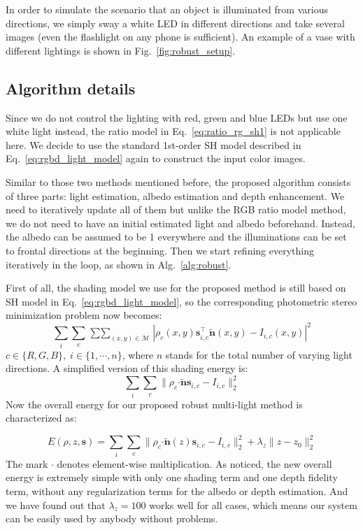 In order to simulate the scenario that an object is illuminated from various directions, we simply sway a white LED in different directions and take several images (even the flashlight on any phone is sufficient). An example of a vase with different lightings is shown in Fig.~\ref{fig:robust_setup}.

\subsection{Algorithm details}
Since we do not control the lighting with red, green and blue LEDs but use one white light instead, the ratio model in Eq.~\ref{eq:ratio_rg_sh1} is not applicable here.
We decide to use the standard 1st-order SH model described in Eq.~\ref{eq:rgbd_light_model} again to construct the input color images.

Similar to those two methods mentioned before, the proposed algorithm consists of three parts: light estimation, albedo estimation and depth enhancement. 
We need to iteratively update all of them but unlike the RGB ratio model method, we do not need to have an initial estimated light and albedo beforehand.
Instead, the albedo can be assumed to be 1 everywhere and the illuminations can be set to frontal directions at the beginning.
Then we start refining everything iteratively in the loop, as shown in Alg.~\ref{alg:robust}.

First of all, the shading model we use for the proposed method is still based on SH model in Eq.~\ref{eq:rgbd_light_model}, so the corresponding photometric stereo minimization problem now becomes:
\begin{equation}
    \sum_{i} \sum_{c} \mathop{\sum \sum}_{(x,y) \in \mathcal{M}} |\rho_c(x,y) \mathbf{s}_{i,c}^\top\tilde{\mathbf{n}}(x,y) - I_{i,c}(x,y)|^2 
\end{equation}
$c\in\{R,G,B\},\; i\in\{ 1, \cdots, n\}$, where $n$ stands for the total number of varying light directions.
A simplified version of this shading energy is:
\begin{equation}
    \sum_{i} \sum_{c} \lVert\rho_c \boldsymbol{\cdot} \tilde{\mathbf{n}}\mathbf{s}_{i,c} -  I_{i,c} \rVert_2^2 
\end{equation}
Now the overall energy for our proposed robust multi-light method is characterized as:

\begin{equation}\label{eq:robust_energy}
    E(\rho, z, \mathbf{s}) = \sum_{i} \sum_{c} \lVert \rho_c \boldsymbol{\cdot} \tilde{\mathbf{n}}(z)\mathbf{s}_{i,c}  - I_{i,c}\rVert_2^2  + \lambda_{z}\lVert z - z_0 \rVert_2^2
\end{equation}
The mark $\boldsymbol{\cdot}$ denotes element-wise multiplication. 
As noticed, the new overall energy is extremely simple with only one shading term and one depth fidelity term, without any regularization terms for the albedo or depth estimation.
And we have found out that $\lambda_z = 100$ works well for all cases, which means our system can be easily used by anybody without problems.

